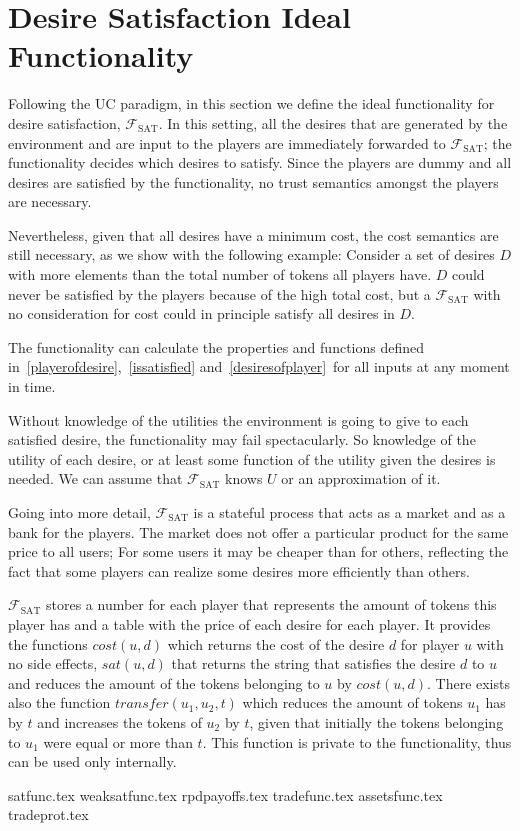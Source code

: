 \section{Desire Satisfaction Ideal Functionality}
  Following the UC paradigm, in this section we define the ideal functionality for desire
  satisfaction, $\mathcal{F}_{\mathrm{SAT}}$. In this setting, all the desires that are
  generated by the environment and are input to the players are immediately forwarded to
  $\mathcal{F}_{\mathrm{SAT}}$; the functionality decides which desires to satisfy. Since
  the players are dummy and all desires are satisfied by the functionality, no trust
  semantics amongst the players are necessary.

  Nevertheless, given that all desires have a minimum cost, the cost semantics are still
  necessary, as we show with the following example: Consider a set of desires $D$ with
  more elements than the total number of tokens all players have. $D$ could never be
  satisfied by the players because of the high total cost, but a
  $\mathcal{F}_{\mathrm{SAT}}$ with no consideration for cost could in principle satisfy
  all desires in $D$.

  The functionality can calculate the properties and functions defined
  in~\ref{playerofdesire},~\ref{issatisfied} and~\ref{desiresofplayer}\ for all inputs at
  any moment in time.

  Without knowledge of the utilities the environment is going to give to each satisfied
  desire, the functionality may fail spectacularly. So knowledge of the utility of each
  desire, or at least some function of the utility given the desires is needed. We can
  assume that $\mathcal{F}_{\mathrm{SAT}}$ knows $U$ or an approximation of it.

  Going into more detail, $\mathcal{F}_{\mathrm{SAT}}$ is a stateful process that acts as
  a market and as a bank for the players. The market does not offer a particular product
  for the same price to all users; For some users it may be cheaper than for others,
  reflecting the fact that some players can realize some desires more efficiently than
  others.

  $\mathcal{F}_{\mathrm{SAT}}$ stores a number for each player that represents the amount
  of tokens this player has and a table with the price of each desire for each player. It
  provides the functions $cost\left(u, d\right)$ which returns the cost of the desire $d$
  for player $u$ with no side effects, $sat\left(u, d\right)$ that returns the string that
  satisfies the desire $d$ to $u$ and reduces the amount of the tokens belonging to $u$ by
  $cost\left(u, d\right)$. There exists also the function $transfer\left(u_1, u_2,
  t\right)$ which reduces the amount of tokens $u_1$ has by $t$ and increases the tokens
  of $u_2$ by $t$, given that initially the tokens belonging to $u_1$ were equal or more
  than $t$. This function is private to the functionality, thus can be used only
  internally.

  {satfunc.tex}
  {weaksatfunc.tex}
  {rpdpayoffs.tex}
  {tradefunc.tex}
  {assetsfunc.tex}
  {tradeprot.tex}
